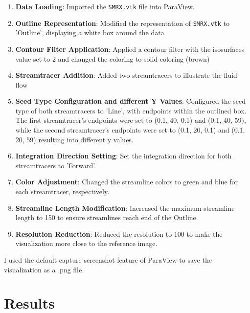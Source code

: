 \documentclass{article}
\begin{document}
\begin{enumerate}
    \item \textbf{Data Loading}: Imported the \texttt{SMRX.vtk} file into ParaView.
    
    \item \textbf{Outline Representation}: Modified the representation of \texttt{SMRX.vtk} to 'Outline', displaying a white box around the data
    
    \item \textbf{Contour Filter Application}: Applied a contour filter with the isosurfaces value set to 2 and changed the coloring to solid coloring (brown)
    
    \item \textbf{Streamtracer Addition}: Added two streamtracers to illustrate the fluid flow
    
    \item \textbf{Seed Type Configuration and different Y Values}: Configured the seed type of both streamtracers to 'Line', with endpoints within the outlined box. The first streamtracer's endpoints were set to (0.1, 40, 0.1) and (0.1, 40, 59), while the second streamtracer's endpoints were set to (0.1, 20, 0.1) and (0.1, 20, 59) resulting into different y values.
        
    \item \textbf{Integration Direction Setting}: Set the integration direction for both streamtracers to 'Forward'.
    
    \item \textbf{Color Adjustment}: Changed the streamline colors to green and blue for each streamtracer, respectively.
    
    \item \textbf{Streamline Length Modification}: Increased the maximum streamline length to 150 to ensure streamlines reach end of the Outline.
    
    \item \textbf{Resolution Reduction}: Reduced the resolution to 100 to make the visualization more close to the reference image.
\end{enumerate}

I used the default capture screenshot feature of ParaView to save the visualization as a .png file. 

\section{Results}
\end{document}
